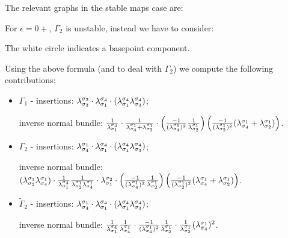 The relevant graphs in the stable maps case are:
\begin{center}
\end{center}
For $\epsilon=0+$, $\Gamma_2$ is unstable, instead we have to consider:
\begin{center}
\end{center}
The white circle indicates a basepoint component. 

Using the above formula (and \cite[Theorem 7.8]{HolgerSpielberg} to deal with $\Gamma_2$) we compute the following contributions:
\begin{itemize}
 \item $\Gamma_1$ - insertions: $\lams{2}{3}\cdot\lams{4}{1}\cdot(\lams{4}{1}\lams{4}{3})$;
 
 inverse normal bundle: $\frac{1}{\lams{4}{1}}\cdot\frac{1}{\lams{1}{4}+\lams{1}{2}}\cdot\left(\frac{-1}{(\lams{1}{4})^2}\frac{1}{\lams{1}{2}}\right)\left(\frac{-1}{(\lams{1}{2})^2}(\lams{1}{4}+\lams{1}{2})\right)$.
 
 \item $\Gamma_2$ - insertions: $\lams{1}{4}\cdot\lams{4}{1}\cdot(\lams{4}{1}\lams{4}{3})$;
 
 inverse normal bundle: $(\lams{1}{2}\lams{1}{4})\cdot\frac{1}{\lams{4}{1}}\frac{1}{\lams{1}{2}\lams{1}{4}}\cdot\lams{2}{1}\cdot\left(\frac{-1}{(\lams{1}{4})^2}\frac{1}{\lams{1}{2}}\right)\left(\frac{-1}{(\lams{1}{2})^2}(\lams{1}{4}+\lams{1}{2})\right)$.
 
 \item $\tilde\Gamma_2$ - insertions: $\lams{1}{4}\cdot\lams{4}{1}\cdot(\lams{4}{1}\lams{4}{3})$;
 
 inverse normal bundle: $\frac{1}{\lams{4}{1}}\frac{1}{\lams{1}{4}}\cdot\frac{-1}{(\lams{1}{4})^2}\frac{1}{\lams{1}{2}}\cdot\frac{1}{\lams{1}{2}}(\lams{1}{4})^2$.
 
\end{itemize}

